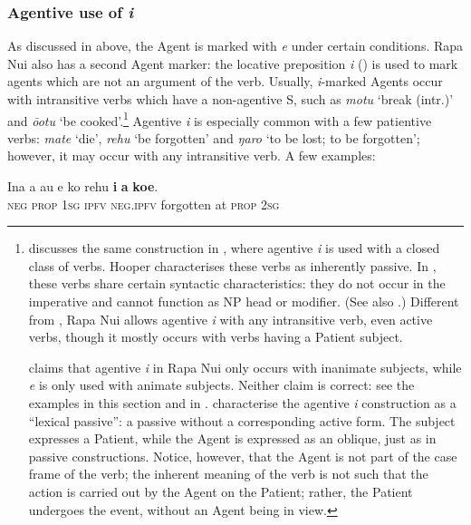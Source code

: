 \subsubsection[Agentive use of i]{Agentive use of \textit{i}}\label{sec:8.6.4.7}
As discussed in  above, the Agent is marked with \textit{e} under certain conditions. Rapa Nui also has a second Agent marker: the locative preposition \textit{i} () is used to mark agents which are not an argument of the verb. Usually, \textit{i}{}-marked Agents occur with intransitive verbs which have a non-agentive S, such as \textit{motu} ‘break (intr.)’ and \textit{{\ꞌ}ō{\ꞌ}otu} ‘be cooked’.\footnote{\label{fn:445}\citet{Hooper1984Neuter} discusses the same construction in , where agentive \textit{i} is used with a closed class of verbs. Hooper characterises these verbs as inherently passive. In , these verbs share certain syntactic characteristics: they do not occur in the imperative and cannot function as NP head or modifier. (See also \citealt[33]{Pucilowsky2006}.) Different from , Rapa Nui allows agentive \textit{i} with any intransitive verb, even active verbs, though it mostly occurs with verbs having a Patient subject. 

\citet[135]{Alexander1981OL} claims that agentive \textit{i} in Rapa Nui only occurs with inanimate subjects, while \textit{e} is only used with animate subjects. Neither claim is correct: see the examples in this section and in . \citet[21]{FinneyAlexander1998} characterise the agentive \textit{i} construction as a “lexical passive”: a passive without a corresponding active form. The subject expresses a Patient, while the Agent is expressed as an oblique, just as in passive constructions. Notice, however, that the Agent is not part of the case frame of the verb; the inherent meaning of the verb is not such that the action is carried out by the Agent on the Patient; rather, the Patient undergoes the event, without an Agent being in view.}  Agentive \textit{i} is especially common with a few patientive verbs: \textit{mate} ‘die’, \textit{rehu} ‘be forgotten’ and \textit{ŋaro} ‘to be lost; to be forgotten’; however, it may occur with any intransitive verb. A few examples:

\ea\label{ex:8.156}
\gll {\ꞌ}Ina a au e ko rehu \textbf{i} \textbf{a} \textbf{koe}.\\
\textsc{neg} \textsc{prop} \textsc{1sg} \textsc{ipfv} \textsc{neg.ipfv} forgotten at \textsc{prop} \textsc{2sg}\\

